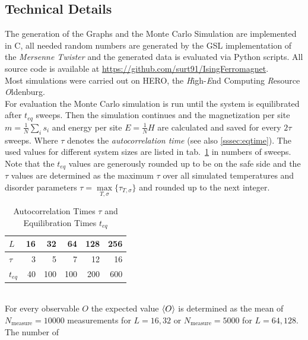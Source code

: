 \subsection{Technical Details}
    The generation of the Graphs and the Monte Carlo Simulation are implemented
    in C, all needed random numbers are generated by the GSL \cite{GSL}
    implementation of the \emph{Mersenne Twister} \cite{Matsumoto1998} and
    the generated data is evaluated via Python scripts.
    All source code is available at \url{https://github.com/surt91/IsingFerromagnet}.\\
    Most simulations were carried out on HERO, the \emph{H}igh-\emph{E}nd
    Computing \emph{R}esource \emph{O}ldenburg.\\

    For evaluation the Monte Carlo simulation is run until the system
    is equilibrated after \(t_{eq}\) sweeps. Then the simulation continues
    and the magnetization per site \(m=\frac{1}{N}\sum_i s_i\) and energy
    per site \(E=\frac{1}{N} H\) are calculated and saved for every
    \(2\tau\) sweeps. Where \(\tau\) denotes the \emph{autocorrelation time}
    (see also \ref{sssec:eqtime}). The used values for different system sizes
    are listed in tab.\ \ref{tab:tauAndTeq} in numbers of sweeps. Note that
    the \(t_{eq}\) values are generously rounded up to be on the safe side
    and the \(\tau\) values are determined as the maximum \(\tau\) over all
    simulated temperatures and disorder parameters \(\tau = \underset{T,\sigma}{\max} \{\tau_{T,\sigma}\}\)
    and rounded up to the next integer.
    \begin{table}[htbp]
        \center
        \begin{tabular}{l r r r r r}
            \toprule
            \(L\)    & 16 &  32 &  64 & 128 & 256\\
            \midrule
            \(\tau\) &  3 &   5 &   7 &  12 &  16\\
            \(t_{eq}\) & 40 & 100 & 100 & 200 & 600\\
            \bottomrule
        \end{tabular}
        \caption{Autocorrelation Times $\tau$ and Equilibration Times $t_{eq}$}
        \label{tab:tauAndTeq}
    \end{table}\\
    For every observable \(O\) the expected value \(\left< O \right>\) is determined
    as the mean of \(N_{\mathrm{measure}}=10000\) measurements for \(L=16,32\)
    or \(N_{\mathrm{measure}}=5000\) for \(L=64,128\). The number of
